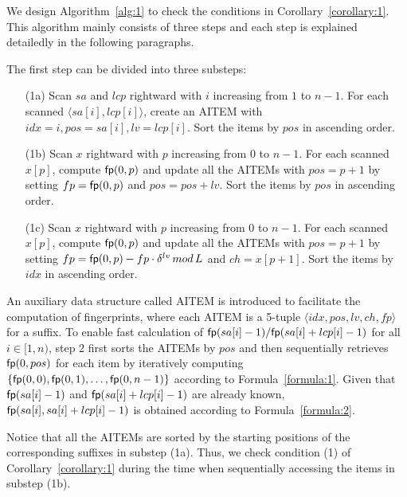 \documentclass[10pt,journal,compsoc]{IEEEtran}
\begin{document}
	We design Algorithm~\ref{alg:1} to check the conditions in Corollary~\ref{corollary:1}. This algorithm mainly consists of three steps and each step is explained detailedly in the following paragraphs.
	
	\vspace{1ex}  The first step can be divided into three substeps:
	
	\begin{enumerate}
		
		\item [(1a)]
		Scan $sa$ and $lcp$ rightward with $i$ increasing from $1$ to $n - 1$. For each scanned $\langle sa[i], lcp[i] \rangle$, create an AITEM with $idx = i, pos = sa[i], lv = lcp[i]$. Sort the items by $pos$ in ascending order.
		
		\item [(1b)]
		Scan $x$ rightward with $p$ increasing from $0$ to $n - 1$. For each scanned $x[p]$, compute ${\sf fp}(0, p)$ and update all the AITEMs with $pos = p + 1$ by setting $fp = {\sf fp}(0, p)$ and $pos = pos + lv$. Sort the items by $pos$ in ascending order.
		
		\item [(1c)]
		Scan $x$ rightward with $p$ increasing from $0$ to $n - 1$. For each scanned $x[p]$, compute ${\sf fp}(0, p)$ and update all the AITEMs with $pos = p + 1$ by setting $fp = {\sf fp}(0, p) - fp \cdot {\delta}^{lv} \, mod \, L $ and $ch = x[p + 1]$. Sort the items by $idx$ in ascending order.
		
	\end{enumerate}
	
	An auxiliary data structure called AITEM is introduced to facilitate the computation of fingerprints, where each AITEM is a 5-tuple $\langle idx, pos, lv, ch, fp\rangle$ for a suffix. To enable fast calculation of ${\sf fp}(sa[i] - 1)/{\sf fp}(sa[i] + lcp[i] - 1)$ for all $i \in [1, n)$, step 2 first sorts the AITEMs by $pos$ and then sequentially retrieves ${\sf fp}(0, pos)$ for each item by iteratively computing $\{{\sf fp}(0, 0), {\sf fp}(0, 1), \dots, {\sf fp}(0, n - 1) \}$ according to Formula~\ref{formula:1}. Given that ${\sf fp}(sa[i] - 1)$ and ${\sf fp}(sa[i] + lcp[i] - 1)$ are already known, ${\sf fp}(sa[i], sa[i] + lcp[i] - 1)$ is obtained according to Formula~\ref{formula:2}.

	Notice that all the AITEMs are sorted by the starting positions of the corresponding suffixes in substep (1a). Thus, we check condition (1) of Corollary~\ref{corollary:1} during the time when sequentially accessing the items in substep (1b).
	
\end{document}
